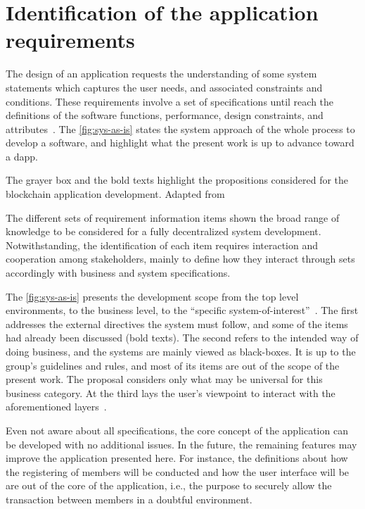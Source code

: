 \section{Identification of the application requirements}
\label{sec:requisitos}

The design of an application requests the understanding of some system statements which captures the user needs, and associated constraints and conditions.
These requirements involve a set of specifications until reach the definitions of the software functions, performance, design constraints, and attributes~\cite{iso-iec-ieee}.
The \autoref{fig:sys-as-is} states the system approach of the whole process to develop a software, and highlight what the present work is up to advance toward a \gls{dapp}.


%
            {\label{fig:sys-as-is}}%
            {The grayer box and the bold texts highlight the propositions considered for the blockchain application development.}%
            {Adapted from }

The different sets of requirement information items shown the broad range of knowledge to be considered for a fully decentralized system development.
Notwithstanding, the identification of each item requires interaction and cooperation among stakeholders, mainly to define how they interact through sets accordingly with business and system specifications.

The \autoref{fig:sys-as-is} presents the development scope from the top level environments, to the business level, to the ``specific system-of-interest''~\cite{iso-iec-ieee}.
The first addresses the external directives the system must follow, and some of the items had already been discussed (bold texts).
The second refers to the intended way of doing business, and the systems are mainly viewed as black-boxes. It is up to the group's guidelines and rules, and most of its items are out of the scope of the present work. The proposal considers only what may be universal for this business category.
At the third lays the user's viewpoint to interact with the aforementioned layers~\cite{iso-iec-ieee}.

Even not aware about all specifications, the core concept of the application can be developed with no additional issues.
In the future, the remaining features may improve the application presented here.
For instance, the definitions about how the registering of members will be conducted and how the user interface will be are out of the core of the application, i.e., the purpose to securely allow the transaction between members in a doubtful environment.

